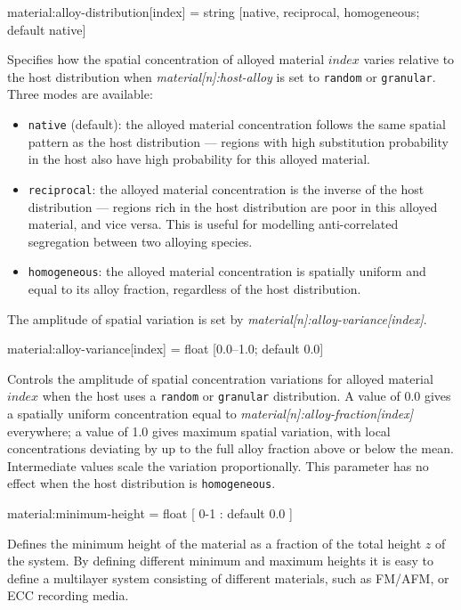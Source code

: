 {\zicf material:alloy-distribution[index] = string [native, reciprocal, homogeneous; default native]} Specifies how the spatial concentration of alloyed material $index$ varies relative to the host distribution when \textit{material[n]:host-alloy} is set to \texttt{random} or \texttt{granular}. Three modes are available:
\begin{itemize}
  \item[] \texttt{native} (default): the alloyed material concentration follows the same spatial pattern as the host distribution --- regions with high substitution probability in the host also have high probability for this alloyed material.
  \item[] \texttt{reciprocal}: the alloyed material concentration is the inverse of the host distribution --- regions rich in the host distribution are poor in this alloyed material, and vice versa. This is useful for modelling anti-correlated segregation between two alloying species.
  \item[] \texttt{homogeneous}: the alloyed material concentration is spatially uniform and equal to its alloy fraction, regardless of the host distribution.
\end{itemize}
The amplitude of spatial variation is set by \textit{material[n]:alloy-variance[index]}.

{\zicf material:alloy-variance[index] = float [0.0--1.0; default 0.0]} Controls the amplitude of spatial concentration variations for alloyed material $index$ when the host uses a \texttt{random} or \texttt{granular} distribution. A value of 0.0 gives a spatially uniform concentration equal to \textit{material[n]:alloy-fraction[index]} everywhere; a value of 1.0 gives maximum spatial variation, with local concentrations deviating by up to the full alloy fraction above or below the mean. Intermediate values scale the variation proportionally. This parameter has no effect when the host distribution is \texttt{homogeneous}.

{\zicf material:minimum-height = float [ 0-1 : default 0.0 ]} Defines the minimum height of the material as a fraction of the total height $z$ of the system. By defining different minimum and maximum heights it is easy to define a multilayer system consisting of different materials, such as FM/AFM, or ECC recording media.

